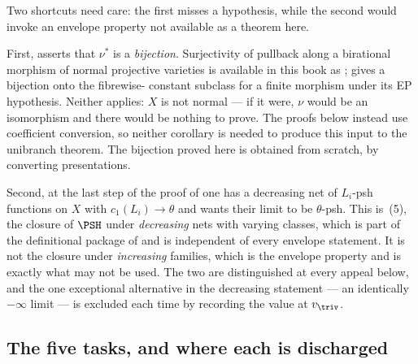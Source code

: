 \begin{remark}
\label{rem:ch43-firewall-not-vacuous}
Two shortcuts need care: the first misses a hypothesis, while the
second would invoke an envelope property not available as a theorem here.

First,  asserts that
$\nu^*$ is a \emph{bijection}.  Surjectivity of pullback along a
birational morphism of normal projective varieties is available in this book
as ;
 gives a bijection onto the fibrewise-
constant subclass for a finite morphism under its EP hypothesis.  Neither applies: $X$ is not normal ---
if it were, $\nu$ would be an isomorphism and there would be nothing to
prove.  The proofs below instead use coefficient conversion, so neither
corollary is needed to produce this input to the unibranch theorem.  The bijection proved here is obtained from scratch, by
converting presentations.

Second, at the last step of the proof of
 one has a decreasing net of
$L_i$-psh functions on $X$ with $c_1(L_i)\to\theta$ and wants their
limit to be $\theta$-psh.  This is \,(5), the
closure of $\PSH$ under \emph{decreasing} nets with varying classes, which
is part of the definitional package of  and is
independent of every envelope statement.  It is not the closure under
\emph{increasing} families, which is the envelope property and is exactly
what may not be used.  The two are distinguished at every appeal below, and
the one exceptional alternative in the decreasing statement --- an
identically $-\infty$ limit --- is excluded each time by recording the
value at $v_\triv$.
\end{remark}

\subsection{The five tasks, and where each is discharged}
\label{sec:ch43-tasks}

